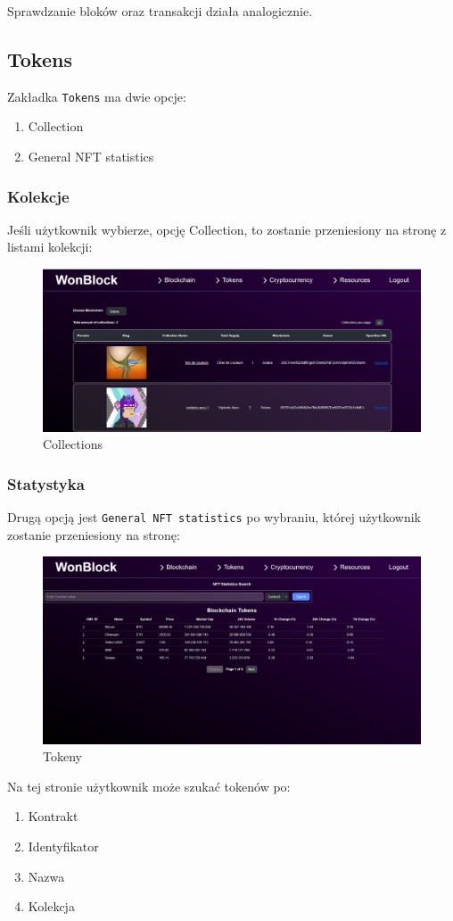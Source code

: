 Sprawdzanie bloków oraz transakcji działa analogicznie.

\subsection{Tokens}
Zakładka \texttt{Tokens} ma dwie opcje:
\begin{enumerate}
    \item Collection
    \item General NFT statistics
\end{enumerate}
\subsubsection{Kolekcje}
Jeśli użytkownik wybierze, opcję Collection, to zostanie przeniesiony na stronę z listami kolekcji:
\begin{figure}[htb]
    \centering
    \includegraphics[width=0.8\linewidth]{./instrukcja/Collections.png}
    \caption{Collections}
    \label{fig:Collections}
\end{figure}
\subsubsection{Statystyka}
Drugą opcją jest \texttt{General NFT statistics} po wybraniu, której użytkownik zostanie przeniesiony na stronę:
\begin{figure}[htb]
    \centering
    \includegraphics[width=0.8\linewidth]{./instrukcja/Tokens.png}
    \caption{Tokeny}
    \label{fig:Tokeny}
\end{figure}
Na tej stronie użytkownik może szukać tokenów po:
\begin{enumerate}
    \item Kontrakt
    \item Identyfikator
		\item Nazwa
		\item Kolekcja
\end{enumerate}

